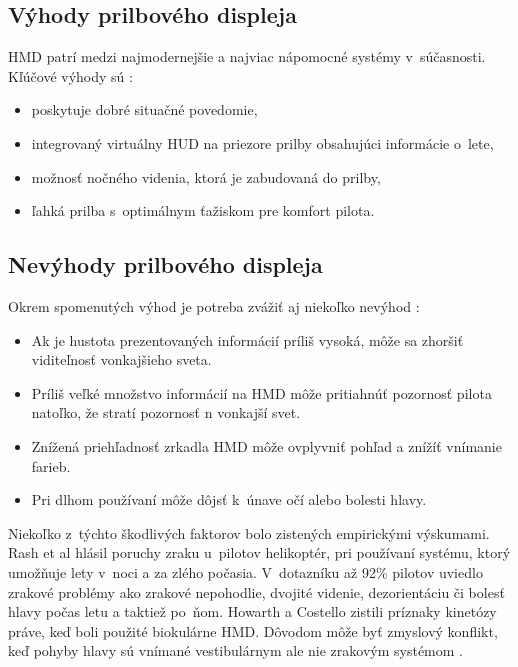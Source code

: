 \subsection{Výhody prilbového displeja}
HMD patrí medzi najmodernejšie a najviac nápomocné systémy v~súčasnosti. Kľúčové výhody sú \cite{HMD}:

\begin{itemize}
    \item poskytuje dobré situačné povedomie,
    \item integrovaný virtuálny HUD na priezore prilby obsahujúci informácie o~lete,
    \item možnosť nočného videnia, ktorá je zabudovaná do prilby,
    \item ľahká prilba s~optimálnym ťažiskom pre komfort pilota.
\end{itemize}

\subsection{Nevýhody prilbového displeja}
Okrem spomenutých výhod je potreba zvážiť aj niekoľko nevýhod \cite{HMDnevyhody}:

\begin{itemize}
    \item Ak je hustota prezentovaných informácií príliš vysoká, môže sa zhoršiť viditeľnosť vonkajšieho sveta.
    \item Príliš veľké množstvo informácií na HMD môže pritiahnúť pozornosť pilota natoľko, že stratí pozornosť n vonkajší svet.
    \item Znížená priehľadnosť zrkadla HMD môže ovplyvniť pohľad a znížíť vnímanie farieb.
    \item Pri dlhom používaní môže dôjsť k~únave očí alebo bolesti hlavy.
\end{itemize}

Niekoľko z~týchto škodlivých faktorov bolo zistených empirickými výskumami. Rash et al hlásil poruchy zraku u~pilotov helikoptér, pri používaní systému, ktorý umožňuje lety v~noci a za zlého počasia. V~dotazníku až 92\% pilotov uviedlo zrakové problémy ako zrakové nepohodlie, dvojité videnie, dezorientáciu či bolesť hlavy počas letu a taktiež po~ňom. Howarth a Costello zistili príznaky kinetózy práve, keď boli použité biokulárne HMD. Dôvodom môže byť zmyslový konflikt, keď pohyby hlavy sú vnímané vestibulárnym ale nie zrakovým systémom \cite{HMDnevyhody}.


